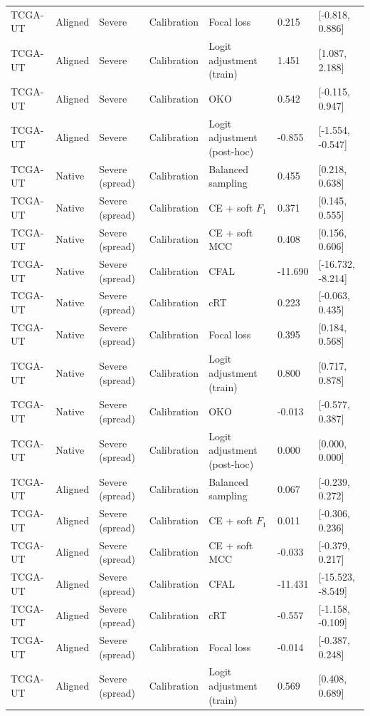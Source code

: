 \begin{longtable}{lllllll}
TCGA-UT & Aligned & Severe & Calibration & Focal loss & 0.215 & [-0.818, 0.886] \\
TCGA-UT & Aligned & Severe & Calibration & Logit adjustment (train) & 1.451 & [1.087, 2.188] \\
TCGA-UT & Aligned & Severe & Calibration & OKO & 0.542 & [-0.115, 0.947] \\
TCGA-UT & Aligned & Severe & Calibration & Logit adjustment (post-hoc) & -0.855 & [-1.554, -0.547] \\
TCGA-UT & Native & Severe (spread) & Calibration & Balanced sampling & 0.455 & [0.218, 0.638] \\
TCGA-UT & Native & Severe (spread) & Calibration & CE + soft $F_1$ & 0.371 & [0.145, 0.555] \\
TCGA-UT & Native & Severe (spread) & Calibration & CE + soft MCC & 0.408 & [0.156, 0.606] \\
TCGA-UT & Native & Severe (spread) & Calibration & CFAL & -11.690 & [-16.732, -8.214] \\
TCGA-UT & Native & Severe (spread) & Calibration & cRT & 0.223 & [-0.063, 0.435] \\
TCGA-UT & Native & Severe (spread) & Calibration & Focal loss & 0.395 & [0.184, 0.568] \\
TCGA-UT & Native & Severe (spread) & Calibration & Logit adjustment (train) & 0.800 & [0.717, 0.878] \\
TCGA-UT & Native & Severe (spread) & Calibration & OKO & -0.013 & [-0.577, 0.387] \\
TCGA-UT & Native & Severe (spread) & Calibration & Logit adjustment (post-hoc) & 0.000 & [0.000, 0.000] \\
TCGA-UT & Aligned & Severe (spread) & Calibration & Balanced sampling & 0.067 & [-0.239, 0.272] \\
TCGA-UT & Aligned & Severe (spread) & Calibration & CE + soft $F_1$ & 0.011 & [-0.306, 0.236] \\
TCGA-UT & Aligned & Severe (spread) & Calibration & CE + soft MCC & -0.033 & [-0.379, 0.217] \\
TCGA-UT & Aligned & Severe (spread) & Calibration & CFAL & -11.431 & [-15.523, -8.549] \\
TCGA-UT & Aligned & Severe (spread) & Calibration & cRT & -0.557 & [-1.158, -0.109] \\
TCGA-UT & Aligned & Severe (spread) & Calibration & Focal loss & -0.014 & [-0.387, 0.248] \\
TCGA-UT & Aligned & Severe (spread) & Calibration & Logit adjustment (train) & 0.569 & [0.408, 0.689] \\

\end{longtable}
